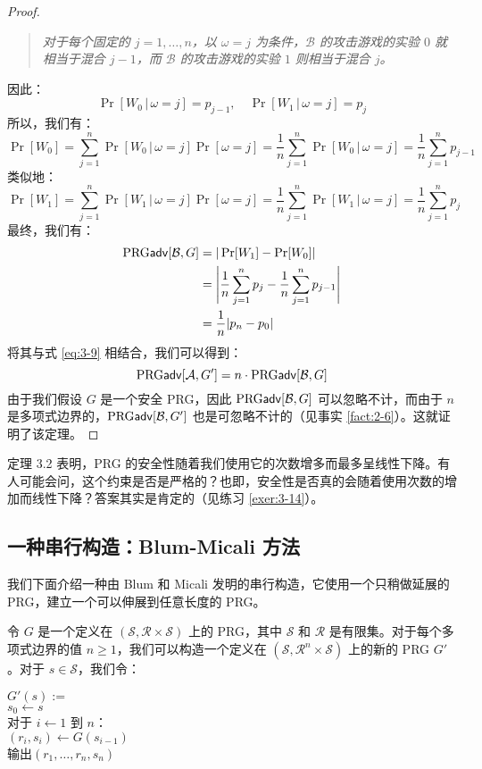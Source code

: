 \begin{proof}
\begin{quote}
\emph{对于每个固定的 $j=1,\dots,n$，以 $\omega=j$ 为条件，$\mathcal B$ 的攻击游戏的实验 $0$ 就相当于混合 $j-1$，而 $\mathcal B$ 的攻击游戏的实验 $1$ 则相当于混合 $j$。
}
\end{quote}
因此：
\[
\Pr[W_0\,|\,\omega=j]=p_{j-1},\quad
\Pr[W_1\,|\,\omega=j]=p_{j}
\]
所以，我们有：
\[
\Pr[W_0]
=\sum_{j=1}^n\Pr[W_0\,|\,\omega=j]\Pr[\omega=j]
=\frac{1}{n}\sum_{j=1}^n\Pr[W_0\,|\,\omega=j]
=\frac{1}{n}\sum_{j=1}^np_{j-1}
\]
类似地：
\[
\Pr[W_1]
=\sum_{j=1}^n\Pr[W_1\,|\,\omega=j]\Pr[\omega=j]
=\frac{1}{n}\sum_{j=1}^n\Pr[W_1\,|\,\omega=j]
=\frac{1}{n}\sum_{j=1}^np_{j}
\]
最终，我们有：
\[
\begin{aligned}
{\rm PRG\mathsf{adv}}[\mathcal{B},G]
&=|\Pr[W_1]-\Pr[W_0]|\\
&=\Bigg\lvert\frac{1}{n}\sum_{j=1}^np_j-\frac{1}{n}\sum_{j=1}^np_{j-1}\Bigg\rvert\\
&=\frac{1}{n}|p_n-p_0|
\end{aligned}
\]
将其与式 \ref{eq:3-9} 相结合，我们可以得到：
\[
{\rm PRG\mathsf{adv}}[\mathcal{A},G']=n\cdot{\rm PRG\mathsf{adv}}[\mathcal{B},G]
\]
由于我们假设 $G$ 是一个安全 PRG，因此 ${\rm PRG\mathsf{adv}}[\mathcal{B},G]$ 可以忽略不计，而由于 $n$ 是多项式边界的，${\rm PRG\mathsf{adv}}[\mathcal{B},G']$ 也是可忽略不计的（见事实 \ref{fact:2-6}）。这就证明了该定理。
\end{proof}

定理 3.2 表明，PRG 的安全性随着我们使用它的次数增多而最多呈线性下降。有人可能会问，这个约束是否是严格的？也即，安全性是否真的会随着使用次数的增加而线性下降？答案其实是肯定的（见练习 \ref{exer:3-14}）。

\subsection{一种串行构造：Blum-Micali 方法}\label{subsec:3-4-2}

我们下面介绍一种由 Blum 和 Micali 发明的串行构造，它使用一个只稍做延展的 PRG，建立一个可以伸展到任意长度的 PRG。

令 $G$ 是一个定义在 $(\mathcal{S},\mathcal{R}\times\mathcal{S})$ 上的 PRG，其中 $\mathcal S$ 和 $\mathcal R$ 是有限集。对于每个多项式边界的值 $n\geq 1$，我们可以构造一个定义在 $(\mathcal{S},\mathcal{R}^n\times\mathcal{S})$ 上的新的 PRG $G'$。对于 $s\in\mathcal{S}$，我们令：

\vspace*{5pt}

\hspace*{5pt} $G'(s):=$\\
\hspace*{50pt} $s_0\leftarrow s$\\
\hspace*{50pt} 对于 $i\leftarrow1$ 到 $n$：\\
\hspace*{75pt} $(r_i,s_i)\leftarrow G(s_{i-1})$\\
\hspace*{50pt} 输出$(r_1,\dots,r_n,s_n)$

